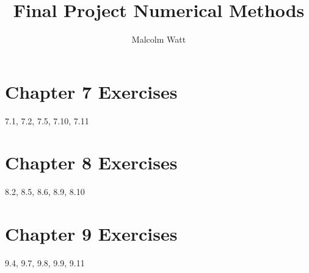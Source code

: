 \documentclass[12pt,a4paper]{report}
\author{Malcolm Watt}
\title{Final Project Numerical Methods}
\begin{document}
\maketitle

\section*{Chapter 7 Exercises}
7.1, 7.2, 7.5, 7.10, 7.11

\section*{Chapter 8 Exercises}
8.2, 8.5, 8.6, 8.9, 8.10

\section*{Chapter 9 Exercises}
9.4, 9.7, 9.8, 9.9, 9.11
\end{document}
